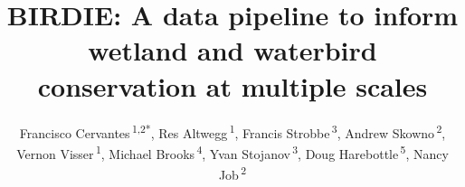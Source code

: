\documentclass[utf8]{frontiersSCNS}
\def\Authors{
  Francisco Cervantes\,\textsuperscript{1,2*},
  Res Altwegg\,\textsuperscript{1},
  Francis Strobbe\,\textsuperscript{3},
  Andrew Skowno\,\textsuperscript{2},
  Vernon Visser\,\textsuperscript{1},
  Michael Brooks\,\textsuperscript{4},
  Yvan Stojanov\,\textsuperscript{3},
  Doug Harebottle\,\textsuperscript{5},
  Nancy Job\,\textsuperscript{2}}
\def\firstAuthorLast{Cervantes {et~al.}}
\begin{document}
\onecolumn
{}


\title[BIRDIE biodiversity data pipeline]{BIRDIE: A data pipeline to
inform wetland and waterbird conservation at multiple scales}
\author[\firstAuthorLast]{\Authors}
\address{} %
\correspondance{} %

\extraAuth{}%


\maketitle
\end{document}
